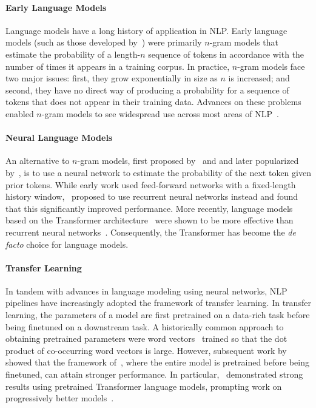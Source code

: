 \paragraph{Early Language Models} Language models have a long history of application in NLP. Early language models (such as those developed by~\citealp{shannon1948mathematical}) were primarily $n$-gram models that estimate the probability of a length-$n$ sequence of tokens in accordance with the number of times it appears in a training corpus. In practice, $n$-gram models face two major issues: first, they grow exponentially in size as $n$ is increased; and second, they have no direct way of producing a probability for a sequence of tokens that does not appear in their training data. Advances on these problems enabled $n$-gram models to see widespread use across most areas of NLP~\citep{goodman2001bit}.

\paragraph{Neural Language Models} An alternative to $n$-gram models, first proposed by~\citet{miikkulainen1991natural} and \citet{schmidhuber1996sequential} and later popularized by~\citet{bengio2000neural}, is to use a neural network to estimate the probability of the next token given prior tokens. While early work used feed-forward networks with a fixed-length history window,~\citet{mikolov2010recurrent,sutskever2011generating,graves2013generating} proposed to use recurrent neural networks instead and found that this significantly improved performance. More recently, language models based on the Transformer architecture~\citep{vaswani2017attention} were shown to be more effective than recurrent neural networks~\citep{radford2018improving,al2019character,kaplan2020scaling}. Consequently, the Transformer has become the \textit{de facto} choice for language models.

\paragraph{Transfer Learning} In tandem with advances in language modeling using neural networks, NLP pipelines have increasingly adopted the framework of transfer learning. In transfer learning, the parameters of a model are first pretrained on a data-rich task before being finetuned on a downstream task. A historically common approach to obtaining pretrained parameters were word vectors~\citep{mikolov2013distributed} trained so that the dot product of co-occurring word vectors is large. However, subsequent work by~\citet{peters2018deep,howard2018universal,radford2018improving,devlin2019bert} showed that the framework of~\citet{collobert2011natural}, where the entire model is pretrained before being finetuned, can attain stronger performance. In particular,~\citet{radford2018improving,devlin2019bert} demonstrated strong results using pretrained Transformer language models, prompting work on progressively better models~\citep[etc.]{liu2019roberta,yang2019xlnet,lewis2020bart,raffel2020exploring,zhang2019ernie}.

